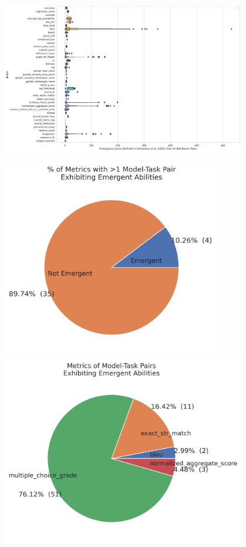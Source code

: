 \begin{figure}
    \centering
    \begin{minipage}[c]{0.7\textwidth}
     \centering
        \includegraphics[width=0.95\textwidth]{figures/big_bench_emergent_tasks/big_bench_breakthrough_scores_by_metric.pdf}%
     \end{minipage}%
     \begin{minipage}[c]{0.3\textwidth}
     \centering
        \includegraphics[width=0.85\textwidth]{figures/big_bench_emergent_tasks/emergence_percent_pie.png}
        \includegraphics[width=0.95\textwidth]{figures/big_bench_emergent_tasks/metric_given_emergent_pie.png}

\end{minipage}
\end{figure}

